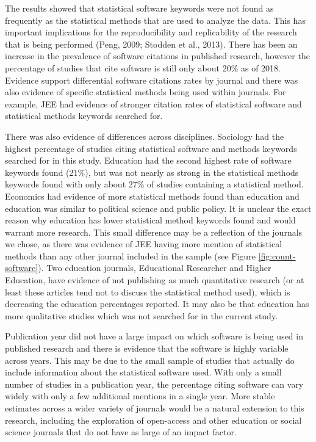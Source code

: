 \documentclass[
  english,
  ,man]{apa6}
\begin{document}
The results showed that statistical software keywords were not found as frequently as the statistical methods that are used to analyze the data. This has important implications for the reproducibility and replicability of the research that is being performed (Peng, 2009; Stodden et al., 2013). There has been an increase in the prevalence of software citations in published research, however the percentage of studies that cite software is still only about 20\% as of 2018. Evidence support differential software citations rates by journal and there was also evidence of specific statistical methods being used within journals. For example, JEE had evidence of stronger citation rates of statistical software and statistical methods keywords searched for.

There was also evidence of differences across disciplines. Sociology had the highest percentage of studies citing statistical software and methods keywords searched for in this study. Education had the second highest rate of software keywords found (21\%), but was not nearly as strong in the statistical methods keywords found with only about 27\% of studies containing a statistical method. Economics had evidence of more statistical methods found than education and education was similar to political science and public policy. It is unclear the exact reason why education has lower statistical method keywords found and would warrant more research. This small difference may be a reflection of the journals we chose, as there was evidence of JEE having more mention of statistical methods than any other journal included in the sample (see Figure \ref{fig:count-software}). Two education journals, Educational Researcher and Higher Education, have evidence of not publishing as much quantitative research (or at least these articles tend not to discuss the statistical method used), which is decreasing the education percentages reported. It may also be that education has more qualitative studies which was not searched for in the current study.

Publication year did not have a large impact on which software is being used in published research and there is evidence that the software is highly variable across years. This may be due to the small sample of studies that actually do include information about the statistical software used. With only a small number of studies in a publication year, the percentage citing software can vary widely with only a few additional mentions in a single year. More stable estimates across a wider variety of journals would be a natural extension to this research, including the exploration of open-access and other education or social science journals that do not have as large of an impact factor.
\end{document}
